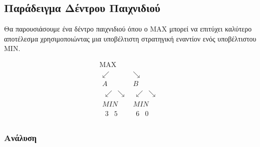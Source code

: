 \documentclass{article}
\begin{document}
\subsection*{Παράδειγμα Δέντρου Παιχνιδιού}

Θα παρουσιάσουμε ένα δέντρο παιχνιδιού όπου ο MAX μπορεί να επιτύχει καλύτερο αποτέλεσμα χρησιμοποιώντας μια υποβέλτιστη στρατηγική εναντίον ενός υποβέλτιστου MIN.

\[
\begin{array}{c}
    \text{MAX} \\
    \begin{array}{cc}
        \swarrow & \searrow \\
        A & B \\
        \begin{array}{cc}
            \swarrow & \searrow
        \end{array} & 
        \begin{array}{cc}
            \swarrow & \searrow
        \end{array} \\
        MIN & MIN \\
        \begin{array}{cc}
            3 & 5
        \end{array} & 
        \begin{array}{cc}
            6 & 0
        \end{array}
    \end{array}
\end{array}
\]

\subsubsection*{Ανάλυση}
\end{document}
